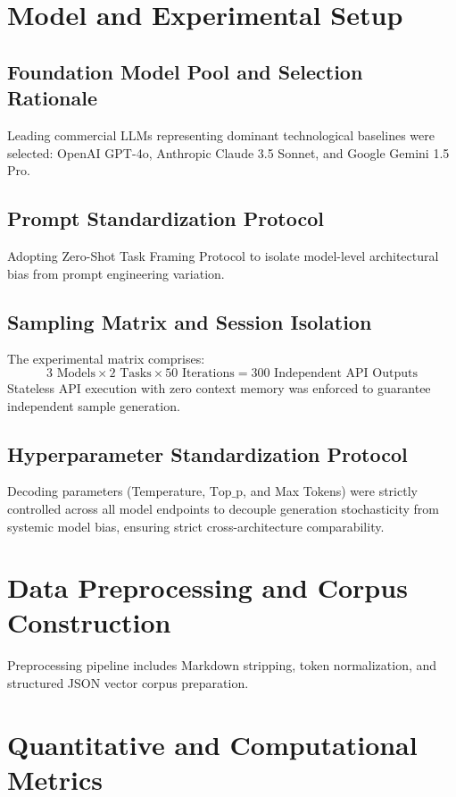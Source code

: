 \section{Model and Experimental Setup}

\subsection{Foundation Model Pool and Selection Rationale}
Leading commercial LLMs representing dominant technological baselines were selected: OpenAI GPT-4o, Anthropic Claude 3.5 Sonnet, and Google Gemini 1.5 Pro.

\subsection{Prompt Standardization Protocol}
Adopting \cite{Sahoo2024} Zero-Shot Task Framing Protocol to isolate model-level architectural bias from prompt engineering variation.

\subsection{Sampling Matrix and Session Isolation}
The experimental matrix comprises:
\begin{equation}
3 \text{ Models} \times 2 \text{ Tasks} \times 50 \text{ Iterations} = 300 \text{ Independent API Outputs}
\end{equation}
Stateless API execution with zero context memory was enforced to guarantee independent sample generation.

\subsection{Hyperparameter Standardization Protocol}
Decoding parameters (Temperature, $\text{Top\_p}$, and Max Tokens) were strictly controlled across all model endpoints to decouple generation stochasticity from systemic model bias, ensuring strict cross-architecture comparability.

\section{Data Preprocessing and Corpus Construction}
Preprocessing pipeline includes Markdown stripping, token normalization, and structured JSON vector corpus preparation.

\section{Quantitative and Computational Metrics}

